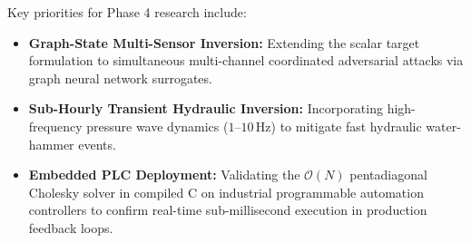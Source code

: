 \documentclass[11pt,a4paper]{article}
\begin{document}
Key priorities for Phase 4 research include:
\begin{itemize}
    \item \textbf{Graph-State Multi-Sensor Inversion:} Extending the scalar target formulation to simultaneous multi-channel coordinated adversarial attacks via graph neural network surrogates.
    \item \textbf{Sub-Hourly Transient Hydraulic Inversion:} Incorporating high-frequency pressure wave dynamics ($1$--$10$\,Hz) to mitigate fast hydraulic water-hammer events.
    \item \textbf{Embedded PLC Deployment:} Validating the $\mathcal{O}(N)$ pentadiagonal Cholesky solver in compiled C on industrial programmable automation controllers to confirm real-time sub-millisecond execution in production feedback loops.
\end{itemize}
\end{document}
